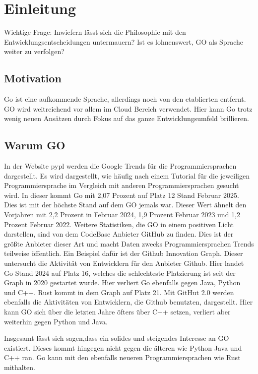 \chapter{Einleitung}\label{ch:intro}

Wichtige Frage: Inwiefern lässt sich die Philosophie mit den Entwicklungsentscheidungen untermauern? Ist es lohnenswert, GO als Sprache weiter zu verfolgen?

\section{Motivation}
Go ist eine aufkommende Sprache, allerdings noch von den etablierten entfernt. GO wird weitreichend vor allem im Cloud Bereich verwendet. Hier kann Go trotz wenig neuen Ansätzen durch Fokus auf das ganze Entwicklungsumfeld brillieren.\cite{cox_go_2022}

\section{Warum GO}
In der Website pypl werden die Google Trends für die Programmiersprachen dargestellt. Es wird dargestellt, wie häufig nach einem Tutorial für die jeweiligen Programmiersprache im Vergleich mit anderen Programmiersprachen gesucht wird. In dieser kommt Go mit 2,07 Prozent auf Platz 12 Stand Februar 2025. Dies ist mit der höchste Stand auf dem GO jemals war. Dieser Wert ähnelt den Vorjahren mit 2,2 Prozent in Februar 2024, 1,9 Prozent Februar 2023 und 1,2 Prozent Februar 2022. 
Weitere Statistiken, die GO in einem positiven Licht darstellen, sind von dem CodeBase Anbieter GitHub zu finden. Dies ist der größte Anbieter dieser Art und macht Daten zwecks Programmiersprachen Trends teilweise öffentlich. Ein Beispiel dafür ist der Github Innovation Graph. Dieser untersucht die Aktivität von Entwicklern für den Anbieter Github. Hier landet Go Stand 2024 auf Platz 16, welches die schlechteste Platzierung ist seit der Graph in 2020 gestartet wurde. Hier verliert Go ebenfalls gegen Java, Python und C++. Rust kommt in dem Graph auf Platz 21. 
Mit GitHut 2.0 werden ebenfalls die Aktivitäten von Entwicklern, die Github benutzten, dargestellt. Hier kann GO sich über die letzten Jahre öfters über C++ setzen, verliert aber weiterhin gegen Python und Java. 

Insgesamt lässt sich sagen,dass ein solides und steigendes Interesse an GO existiert. Dieses kommt hingegen nicht gegen die älteren wie Python Java und C++ ran. Go kann mit den ebenfalls neueren Programmiersprachen wie Rust mithalten. 


